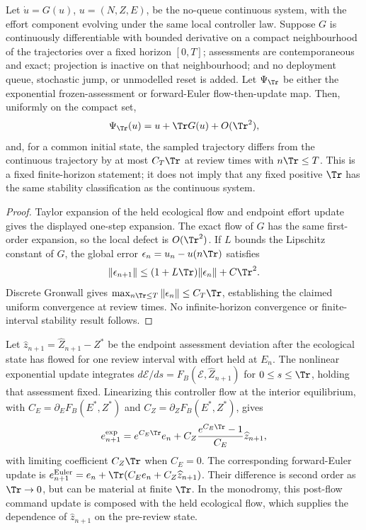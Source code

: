 \begin{lemma}\label{lem:rapid-review}
Let \(\dot u=G(u)\), \(u=(N,Z,E)\), be the no-queue continuous system, with the effort component evolving under the same local controller law. Suppose \(G\) is continuously differentiable with bounded derivative on a compact neighbourhood of the trajectories over a fixed horizon \([0,T]\); assessments are contemporaneous and exact; projection is inactive on that neighbourhood; and no deployment queue, stochastic jump, or unmodelled reset is added. Let \(\Psi_{\Tr}\) be either the exponential frozen-assessment or forward-Euler flow-then-update map. Then, uniformly on the compact set,
\[
\Psi_{\Tr}(u)=u+\Tr G(u)+O(\Tr^2),
\]
and, for a common initial state, the sampled trajectory differs from the continuous trajectory by at most \(C_T\Tr\) at review times with \(n\Tr\leq T\). This is a fixed finite-horizon statement; it does not imply that any fixed positive \(\Tr\) has the same stability classification as the continuous system.
\end{lemma}
\begin{proof}
Taylor expansion of the held ecological flow and endpoint effort update gives the displayed one-step expansion. The exact flow of \(G\) has the same first-order expansion, so the local defect is \(O(\Tr^2)\). If \(L\) bounds the Lipschitz constant of \(G\), the global error \(\epsilon_n=u_n-u(n\Tr)\) satisfies
\[
\|\epsilon_{n+1}\|\leq(1+L\Tr)\|\epsilon_n\|+C\Tr^2.
\]
Discrete Gronwall gives \(\max_{n\Tr\leq T}\|\epsilon_n\|\leq C_T\Tr\), establishing the claimed uniform convergence at review times. No infinite-horizon convergence or finite-interval stability result follows.
\end{proof}

Let \(\widehat z_{n+1}=\widehat Z_{n+1}-Z^*\) be the endpoint assessment deviation after the ecological state has flowed for one review interval with effort held at \(E_n\). The nonlinear exponential update integrates \(d\mathcal E/ds=F_B(\mathcal E,\widehat Z_{n+1})\) for \(0\leq s\leq\Tr\), holding that assessment fixed. Linearizing this controller flow at the interior equilibrium, with \(C_E=\partial_EF_B(E^*,Z^*)\) and \(C_Z=\partial_ZF_B(E^*,Z^*)\), gives
\[
e_{n+1}^{\rm exp}=e^{C_E\Tr}e_n+C_Z\frac{e^{C_E\Tr}-1}{C_E}\widehat z_{n+1},
\]
with limiting coefficient \(C_Z\Tr\) when \(C_E=0\). The corresponding forward-Euler update is \(e_{n+1}^{\rm Euler}=e_n+\Tr(C_Ee_n+C_Z\widehat z_{n+1})\). Their difference is second order as \(\Tr\to0\), but can be material at finite \(\Tr\). In the monodromy, this post-flow command update is composed with the held ecological flow, which supplies the dependence of \(\widehat z_{n+1}\) on the pre-review state.

